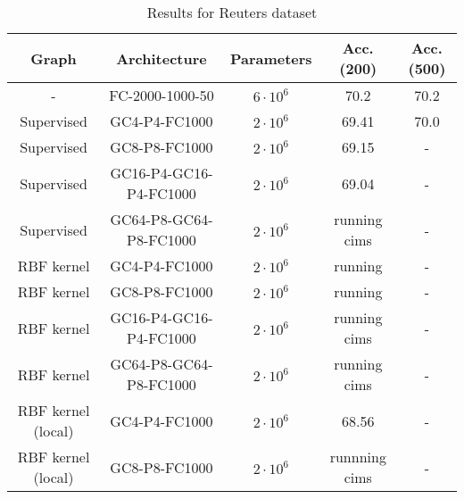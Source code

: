 \documentclass{article} %
\begin{document}
\begin{table}[H]
\caption{Results for Reuters dataset}
\begin{center}
\begin{tabular}{|c|c|c|c|c|}
\hline
Graph & Architecture & Parameters & Acc. (200) & Acc. (500)\\
\hline
- &FC-2000-1000-50 & $6 \cdot 10^6$ & 70.2 & 70.2 \\
Supervised & GC4-P4-FC1000 & $2\cdot 10^6$ & 69.41 & 70.0 \\
Supervised & GC8-P8-FC1000 & $2 \cdot 10^6$ & 69.15 & - \\
Supervised & GC16-P4-GC16-P4-FC1000& $2 \cdot 10^6$ & 69.04 & - \\
Supervised &GC64-P8-GC64-P8-FC1000 & $2 \cdot 10^6$ & running cims & - \\
RBF kernel & GC4-P4-FC1000 & $2\cdot 10^6$ & running & - \\
RBF kernel & GC8-P8-FC1000 & $2 \cdot 10^6$ & running & - \\
RBF kernel & GC16-P4-GC16-P4-FC1000 & $2 \cdot 10^6$ & running cims & - \\
RBF kernel & GC64-P8-GC64-P8-FC1000 & $2 \cdot 10^6$ & running cims & - \\
RBF kernel (local)& GC4-P4-FC1000 & $2\cdot 10^6$ & 68.56 & - \\
RBF kernel (local) & GC8-P8-FC1000 & $2 \cdot 10^6$ & runnning cims & - \\
\hline
\end{tabular}
\end{center}
\end{table}
\end{document}
